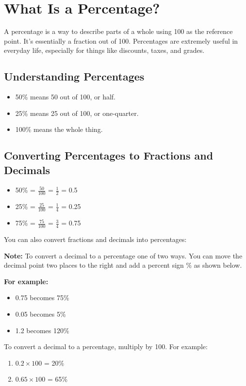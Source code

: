 \section{What Is a Percentage?}
A percentage is a way to describe parts of a whole using 100 as the reference point. It’s essentially a fraction out of 100. Percentages are extremely useful in everyday life, especially for things like discounts, taxes, and grades.

\subsection{Understanding Percentages}
\begin{itemize}
    \item 50\% means 50 out of 100, or half.
    \item 25\% means 25 out of 100, or one-quarter.
    \item 100\% means the whole thing.
\end{itemize}

\subsection{Converting Percentages to Fractions and Decimals}
\begin{itemize}
    \item 50\% = $\frac{50}{100}$ = $\frac{1}{2}$ = 0.5
    \item 25\% = $\frac{25}{100}$ = $\frac{1}{4}$ = 0.25
    \item 75\% = $\frac{75}{100}$ = $\frac{3}{4}$ = 0.75
\end{itemize}

You can also convert fractions and decimals into percentages:

\textbf{Note:}
To convert a decimal to a percentage one of two ways.
You can move the decimal point two places to the right and add a percent sign \% as shown below.

\textbf{For example:}
\begin{itemize}
    \item 0.75 becomes 75\%
    \item 0.05 becomes 5\%
    \item 1.2 becomes 120\%
\end{itemize}

To convert a decimal to a percentage, multiply by 100. For example:
\begin{enumerate}
    \item $0.2 \times 100$ = 20\%
    \item $0.65 \times 100$ = 65\%
\end{enumerate}

